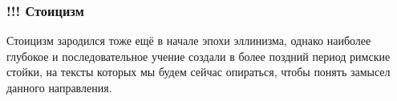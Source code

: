 
\subsubsection{!!! Стоицизм}

Стоицизм зародился тоже ещё в начале эпохи эллинизма, однако наиболее глубокое и
последовательное учение создали в более поздний период римские стойки, на тексты
которых мы будем сейчас опираться, чтобы понять замысел данного направления. 

